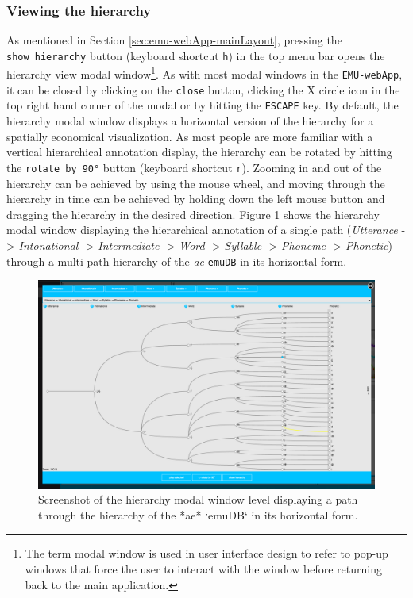 \documentclass[]{book}
\let\rmarkdownfootnote\footnote%
\def\footnote{\protect\rmarkdownfootnote}
\theoremstyle{definition}
\theoremstyle{definition}
\theoremstyle{definition}
\theoremstyle{remark}
\begin{document}
\hypertarget{viewing-the-hierarchy}{%
\subsubsection{Viewing the hierarchy}\label{viewing-the-hierarchy}}

As mentioned in Section \ref{sec:emu-webApp-mainLayout}, pressing the
\texttt{show\ hierarchy} button (keyboard shortcut \texttt{h}) in the
top menu bar opens the hierarchy view modal
window\footnote{The term modal window is used in user interface design to refer to pop-up windows that force the user to interact with the window before returning back to the main application.}.
As with most modal windows in the \texttt{EMU-webApp}, it can be closed
by clicking on the \texttt{close} button, clicking the X circle icon in
the top right hand corner of the modal or by hitting the \texttt{ESCAPE}
key. By default, the hierarchy modal window displays a horizontal
version of the hierarchy for a spatially economical visualization. As
most people are more familiar with a vertical hierarchical annotation
display, the hierarchy can be rotated by hitting the
\texttt{rotate\ by\ 90°} button (keyboard shortcut \texttt{r}). Zooming
in and out of the hierarchy can be achieved by using the mouse wheel,
and moving through the hierarchy in time can be achieved by holding down
the left mouse button and dragging the hierarchy in the desired
direction. Figure \ref{fig:webApp-hierModal} shows the hierarchy modal
window displaying the hierarchical annotation of a single path
(\emph{Utterance} -\textgreater{} \emph{Intonational} -\textgreater{}
\emph{Intermediate} -\textgreater{} \emph{Word} -\textgreater{}
\emph{Syllable} -\textgreater{} \emph{Phoneme} -\textgreater{}
\emph{Phonetic}) through a multi-path hierarchy of the \emph{ae}
\texttt{emuDB} in its horizontal form.

\begin{figure}

{\centering \includegraphics[width=0.75\linewidth]{pics/emu-webAppHierModal} 

}

\caption{Screenshot of the hierarchy modal window level displaying a path through the hierarchy of the *ae* `emuDB` in its horizontal form.}\label{fig:webApp-hierModal}
\end{figure}
\end{document}
